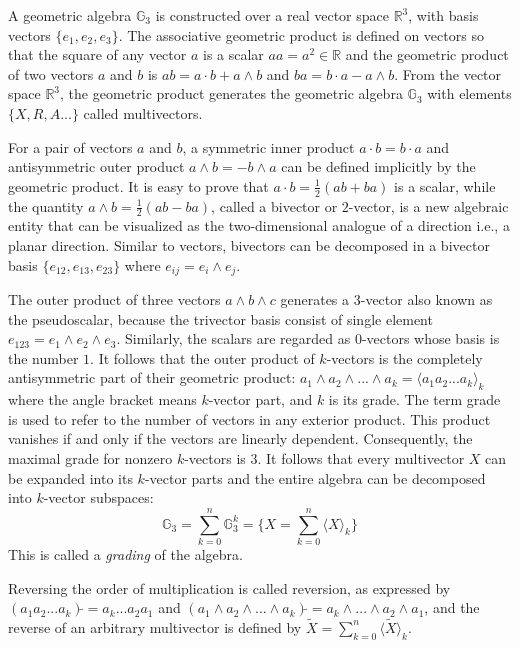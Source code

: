 \documentclass{birkjour}
\numberwithin{equation}{section}
\begin{document}
A geometric algebra $\mathbb{G}_3$ is constructed over a real vector space $\mathbb R^3$, with basis vectors $\{e_1, e_2, e_3\}$. The associative geometric product is defined on vectors so that the square of any vector $a$ is a scalar $a a = a^2 \in \mathbb{R}$ and the geometric product of two vectors $a$ and $b$ is $a b = a \cdot b + a \wedge b$ and $b a = b \cdot a - a \wedge b$. From the vector space $\mathbb R^3$, the geometric product generates the geometric algebra $\mathbb{G}_3$ with elements $\{ X, R, A...\}$ called multivectors.

For a pair of vectors $a$ and $b$, a symmetric inner product $a \cdot b = b \cdot a$ and antisymmetric outer product $a \wedge b = -b \wedge a$ can be defined implicitly by the geometric product. It is easy to prove that $a \cdot b = \frac{1}{2}(a b + b a)$ is a scalar, while the quantity $a \wedge b = \frac{1}{2}(a b - b a)$, called a bivector or $2$-vector, is a new algebraic entity that can be visualized as the two-dimensional analogue of a direction i.e., a planar direction. Similar to vectors, bivectors can be decomposed in a bivector basis $\{ e_{12}, e_{13}, e_{23} \}$ where $e_{ij} = e_i \wedge e_j$.

The outer product of three vectors $a \wedge b \wedge c$ generates a $3$-vector also known as the pseudoscalar, because the trivector basis consist of single element $e_{123} = e_1 \wedge e_2 \wedge e_3$. Similarly, the scalars are regarded as $0$-vectors whose basis is the number $1$. It follows that the outer product of $k$-vectors is the completely antisymmetric part of their geometric product: $a_1 \wedge a_2 \wedge ... \wedge a_k = \langle a_1 a_2 ... a_k \rangle_k$ where the angle bracket means $k$-vector part, and $k$ is its grade. The term grade is used to refer to the number of vectors in any exterior product. This product vanishes if and only if the vectors are linearly dependent. Consequently, the maximal grade for nonzero $k$-vectors is $3$. It follows that every multivector $X$ can be expanded into its $k$-vector parts and the entire algebra can be decomposed into $k$-vector subspaces:
\begin{equation*}
\mathbb G_3 = \sum_{k=0}^n{\mathbb{G}^k_3} = \{ X = \sum_{k=0}^n { \langle X \rangle_k } \}
\end{equation*}
This is called a \emph{grading} of the algebra. 

Reversing the order of multiplication is called reversion, as expressed by $(a_1 a_2 ... a_k)\tilde{} = a_k ... a_2 a_1$ and $(a_1 \wedge a_2 \wedge ... \wedge a_k)\tilde{} = a_k \wedge ... \wedge a_2 \wedge a_1$, and the reverse of an arbitrary multivector is defined by $\tilde{X} = \sum_{k=0}^n { \langle \tilde{X} \rangle_k }$.
\end{document}
